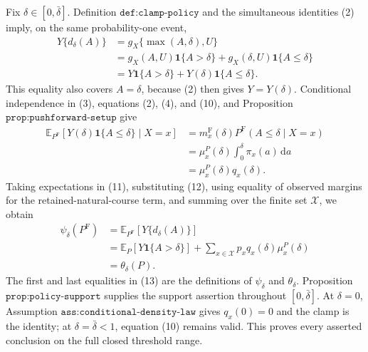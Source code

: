 Fix \(\delta\in[0,\bar\delta]\).  Definition \(\texttt{def:clamp-policy}\) and the simultaneous identities (2) imply, on the same probability-one event,
\[
\begin{aligned}
 Y\{d_\delta(A)\}
 &=g_X\{\max(A,\delta),U\}\\
 &=g_X(A,U)\mathbf 1\{A>\delta\}
   +g_X(\delta,U)\mathbf 1\{A\leq\delta\}\\
 &=Y\mathbf 1\{A>\delta\}+Y(\delta)\mathbf 1\{A\leq\delta\}.
\end{aligned}
\tag{11}
\]
This equality also covers \(A=\delta\), because (2) then gives \(Y=Y(\delta)\).  Conditional independence in (3), equations (2), (4), and (10), and Proposition \(\texttt{prop:pushforward-setup}\) give
\[
\begin{aligned}
 \mathbb E_{P^{\mathrm F}}[Y(\delta)\mathbf 1\{A\leq\delta\}\mid X=x]
 &=m_x^{\mathrm F}(\delta)P^{\mathrm F}(A\leq\delta\mid X=x)\\
 &=\mu_x^P(\delta)\int_0^\delta\pi_x(a)\,\mathrm da\\
 &=\mu_x^P(\delta)q_x(\delta).
\end{aligned}
\tag{12}
\]
Taking expectations in (11), substituting (12), using equality of observed margins for the retained-natural-course term, and summing over the finite set \(\mathcal X\), we obtain
\[
\begin{aligned}
 \psi_\delta(P^{\mathrm F})
 &=\mathbb E_{P^{\mathrm F}}[Y\{d_\delta(A)\}]\\
 &=\mathbb E_P[Y\mathbf 1\{A>\delta\}]
   +\sum_{x\in\mathcal X}p_xq_x(\delta)\mu_x^P(\delta)\\
 &=\theta_\delta(P).
\end{aligned}
\tag{13}
\]
The first and last equalities in (13) are the definitions of \(\psi_\delta\) and \(\theta_\delta\).  Proposition \(\texttt{prop:policy-support}\) supplies the support assertion throughout \([0,\bar\delta]\).  At \(\delta=0\), Assumption \(\texttt{ass:conditional-density-law}\) gives \(q_x(0)=0\) and the clamp is the identity; at \(\delta=\bar\delta<1\), equation (10) remains valid.  This proves every asserted conclusion on the full closed threshold range.